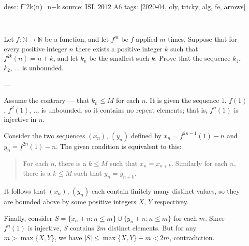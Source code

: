 desc: f^{2k}(n)=n+k
source: ISL 2012 A6
tags: [2020-04, oly, tricky, alg, fe, arrows]

---

Let $f:\mathbb N\to\mathbb N$ be a function, and let $f^m$ be $f$ applied $m$ times. Suppose that for every positive integer $n$ there exists a positive integer $k$ such that $f^{2k}(n)=n+k$, and let $k_n$ be the smallest such $k$. Prove that the sequence $k_1$, $k_2$, $\ldots$ is unbounded.

---

Assume the contrary --- that $k_n\le M$ for each $n$. It is given the sequence $1$, $f(1)$, $f^2(1)$, $\ldots$ is unbounded, so it contains no repeat elements; that is, $f^n(1)$ is injective in $n$.

Consider the two sequences $(x_n)$, $(y_n)$ defined by $x_n=f^{2n-1}(1)-n$ and $y_n=f^{2n}(1)-n$. The given condition is equivalent to this:
\begin{quote}
    For each $n$, there is a $k\le M$ such that $x_n=x_{n+k}$. Similarly for each $n$, there is a $k\le M$ such that $y_n=y_{n+k}$.
\end{quote}
It follows that $(x_n)$, $(y_n)$ each contain finitely many distinct values, so they are bounded above by some positive integers $X$, $Y$ respectivey.

Finally, consider $S=\{x_n+n:n\le m\}\cup\{y_n+n:n\le m\}$ for each $m$. Since $f^n(1)$ is injective, $S$ contains $2m$ distinct elements. But for any $m>\max\{X,Y\}$, we have $|S|\le\max\{X,Y\}+m<2m$, contradiction.

